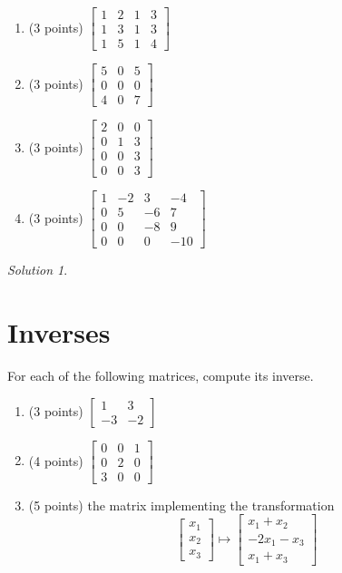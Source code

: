 \documentclass{article}
\theoremstyle{remark}
\newtheorem*{solution}{Solution}
\begin{document}
\begin{enumerate}
\item (3 points)
  $
  \begin{bmatrix}
    1 & 2 & 1 & 3 \\
    1 & 3 & 1 & 3 \\
    1 & 5 & 1 & 4
  \end{bmatrix}
  $
\item (3 points)
  $
  \begin{bmatrix}
    5 & 0 & 5 \\
    0 & 0 & 0 \\
    4 & 0 & 7
  \end{bmatrix}
  $
\item (3 points)
  $
  \begin{bmatrix}
    2 & 0 & 0 \\
    0 & 1 & 3 \\
    0 & 0 & 3 \\
    0 & 0 & 3
  \end{bmatrix}
  $
\item (3 points)
  $
  \begin{bmatrix}
    1 & -2 & 3 & -4 \\
    0 & 5 & -6 &  7 \\
    0 & 0 & -8 & 9 \\
    0 & 0 & 0 & -10
  \end{bmatrix}
  $
\end{enumerate}
\medskip

\begin{solution}
\end{solution}

\pagebreak
\section{Inverses}
For each of the following matrices, compute its inverse.
\begin{enumerate}
\item (3 points) $\begin{bmatrix} 1 & 3 \\ -3 & -2 \end{bmatrix}$
\item (4 points) $\begin{bmatrix} 0 & 0 & 1 \\ 0 & 2 & 0 \\ 3 & 0 & 0 \end{bmatrix}$
\item (5 points) the matrix implementing the transformation
  \begin{displaymath}
    \begin{bmatrix}
      x_1 \\ x_2 \\ x_3
    \end{bmatrix}
    \mapsto
    \begin{bmatrix}
      x_1 + x_2 \\
      -2x_1 - x_3 \\
      x_1 + x_3
    \end{bmatrix}
  \end{displaymath}
\end{enumerate}
\end{document}
